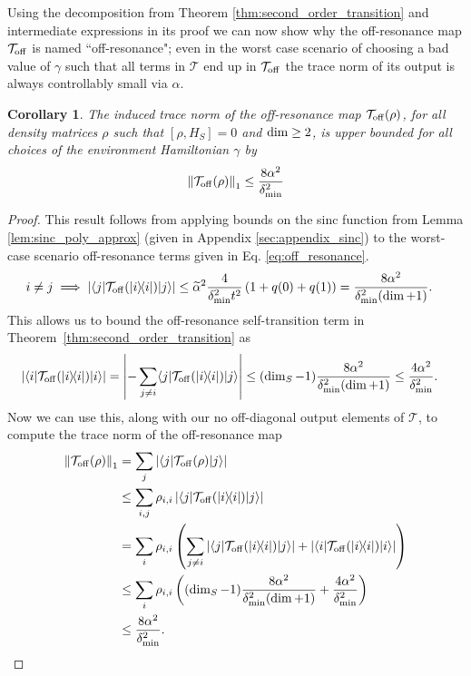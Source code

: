 \documentclass[
 amsmath,amssymb,
 aps,
onecolumn, 
nofootinbib]{revtex4-2}
\newtheorem{corollary}[theorem]{Corollary}
\newcommand{\off}{\rm off}
\newcommand{\ket}[1]{|#1\rangle}
\newcommand{\bra}[1]{\langle #1|}
\newcommand{\ketbra}[2]{| #1\rangle\! \langle #2|}
\newcommand{\abs}[1]{\left| #1 \right|}
\newcommand{\norm}[1]{\left\| #1 \right\|}
\begin{document}
Using the decomposition from Theorem \ref{thm:second_order_transition} and intermediate expressions in its proof we can now show why the off-resonance map $\mathcal{T}_{\off}$ is named ``off-resonance"; even in the worst case scenario of choosing a bad value of $\gamma$ such that all terms in $\mathcal{T}$ end up in $\mathcal{T}_{\off}$ the trace norm of its output is always controllably small via $\alpha$.
\begin{corollary} \label{cor:t_off_norm}
    The induced trace norm of the off-resonance map $\mathcal{T}_{\off}(\rho)$, for all density matrices $\rho$ such that $[\rho, H_S] = 0$ and $\rm{dim}\ge 2$, is upper bounded for all choices of the environment Hamiltonian $\gamma$ by
    \begin{align}
        \norm{\mathcal{T}_{\off}(\rho)}_1 \le \frac{8 \alpha^2}{\delta_{\min}^2}
    \end{align}
\end{corollary}
\begin{proof}

This result follows from applying bounds on the sinc function from Lemma \ref{lem:sinc_poly_approx} (given in Appendix \ref{sec:appendix_sinc}) to the worst-case scenario off-resonance terms given in Eq. \eqref{eq:off_resonance}. 
    \begin{align}
        i \neq j \implies \abs{\bra{j}\mathcal{T}_{\off}(\ketbra{i}{i})\ket{j}} &\le \widetilde{\alpha}^2\frac{4}{\delta_{\min}^2 t^2} \left( 1 + q(0) + q(1)\right) = \frac{8 \alpha^2}{\delta_{\min}^2(\dim + 1)}.
    \end{align}
    This allows us to bound the off-resonance self-transition term in Theorem~\ref{thm:second_order_transition} as
    \begin{align}
        \abs{\bra{i}\mathcal{T}_{\off}(\ketbra{i}{i})\ket{i}} &= \abs{- \sum_{j \neq i} \bra{j} \mathcal{T}_{\off}(\ketbra{i}{i}) \ket{j}} \le (\dim_S - 1) \frac{8 \alpha^2}{\delta_{\min}^2 (\dim + 1)} \le \frac{4 \alpha^2}{\delta_{\min}^2}.
    \end{align}
    Now we can use this, along with our no off-diagonal output elements of $\mathcal{T}$, to compute the trace norm of the off-resonance map
    \begin{align}
        \norm{\mathcal{T}_{\off}(\rho)}_1 &= \sum_{j} \abs{\bra{j} \mathcal{T}_{\off}(\rho) \ket{j}} \\
        &\le \sum_{i, j} \rho_{i,i} \abs{\bra{j}\mathcal{T}_{\off}(\ketbra{i}{i})\ket{j}} \\
        &= \sum_{i} \rho_{i,i} \left(\sum_{j \neq i} |\bra{j} \mathcal{T}_{\off}(\ketbra{i}{i}) \ket{j}| + |\bra{i} \mathcal{T}_{\off}(\ketbra{i}{i})\ket{i}| \right) \\
        &\le \sum_{i} \rho_{i,i} \left( (\dim_S - 1) \frac{8 \alpha^2}{\delta_{\min}^2(\dim + 1)} + \frac{4 \alpha^2}{\delta_{\min}^2} \right) \\
        &\le \frac{8 \alpha^2}{\delta_{\min}^2}.
    \end{align}
\end{proof}
\end{document}
